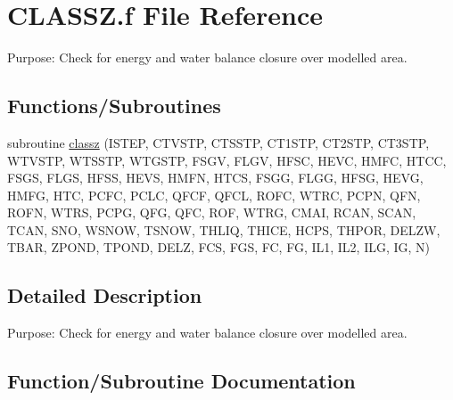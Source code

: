 \hypertarget{CLASSZ_8f}{}\section{C\+L\+A\+S\+S\+Z.\+f File Reference}
\label{CLASSZ_8f}


Purpose\+: Check for energy and water balance closure over modelled area.  


\subsection*{Functions/\+Subroutines}
\begin{DoxyCompactItemize}
\item 
subroutine \hyperlink{CLASSZ_8f_a3011accdb26e214045175dff31aead39}{classz} (I\+S\+T\+E\+P, C\+T\+V\+S\+T\+P, C\+T\+S\+S\+T\+P, C\+T1\+S\+T\+P, C\+T2\+S\+T\+P, C\+T3\+S\+T\+P, W\+T\+V\+S\+T\+P, W\+T\+S\+S\+T\+P, W\+T\+G\+S\+T\+P, F\+S\+G\+V, F\+L\+G\+V, H\+F\+S\+C, H\+E\+V\+C, H\+M\+F\+C, H\+T\+C\+C, F\+S\+G\+S, F\+L\+G\+S, H\+F\+S\+S, H\+E\+V\+S, H\+M\+F\+N, H\+T\+C\+S, F\+S\+G\+G, F\+L\+G\+G, H\+F\+S\+G, H\+E\+V\+G, H\+M\+F\+G, H\+T\+C, P\+C\+F\+C, P\+C\+L\+C, Q\+F\+C\+F, Q\+F\+C\+L, R\+O\+F\+C, W\+T\+R\+C, P\+C\+P\+N, Q\+F\+N, R\+O\+F\+N, W\+T\+R\+S, P\+C\+P\+G, Q\+F\+G, Q\+F\+C, R\+O\+F, W\+T\+R\+G, C\+M\+A\+I, R\+C\+A\+N, S\+C\+A\+N, T\+C\+A\+N, S\+N\+O, W\+S\+N\+O\+W, T\+S\+N\+O\+W, T\+H\+L\+I\+Q, T\+H\+I\+C\+E, H\+C\+P\+S, T\+H\+P\+O\+R, D\+E\+L\+Z\+W, T\+B\+A\+R, Z\+P\+O\+N\+D, T\+P\+O\+N\+D, D\+E\+L\+Z, F\+C\+S, F\+G\+S, F\+C, F\+G, I\+L1, I\+L2, I\+L\+G, I\+G, N)
\end{DoxyCompactItemize}


\subsection{Detailed Description}
Purpose\+: Check for energy and water balance closure over modelled area. 



\subsection{Function/\+Subroutine Documentation}
\hypertarget{CLASSZ_8f_a3011accdb26e214045175dff31aead39}{}
